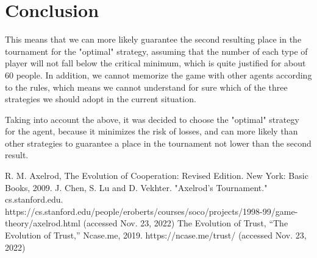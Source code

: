 \documentclass[conference]{IEEEtran}
\begin{document}
\section{Conclusion}
This means that we can more likely guarantee the second resulting place in the tournament for the "optimal" strategy, assuming that the number of each type of player will not fall below the critical minimum, which is quite justified for about 60 people. In addition, we cannot memorize the game with other agents according to the rules, which means we cannot understand for sure which of the three strategies we should adopt in the current situation.

Taking into account the above, it was decided to choose the "optimal" strategy for the agent, because it minimizes the risk of losses, and can more likely than other strategies to guarantee a place in the tournament not lower than the second result.


\begin{thebibliography}{00}
 R. M. Axelrod, The Evolution of Cooperation: Revised Edition. New York: Basic Books, 2009.
 J. Chen, S. Lu and D. Vekhter. "Axelrod's Tournament." cs.stanford.edu. https://cs.stanford.edu/people/eroberts/courses/soco/projects/1998-99/game-theory/axelrod.html (accessed Nov. 23, 2022)
 The Evolution of Trust, “The Evolution of Trust,” Ncase.me, 2019. https://ncase.me/trust/ (accessed Nov. 23, 2022)
\end{thebibliography}
\end{document}
